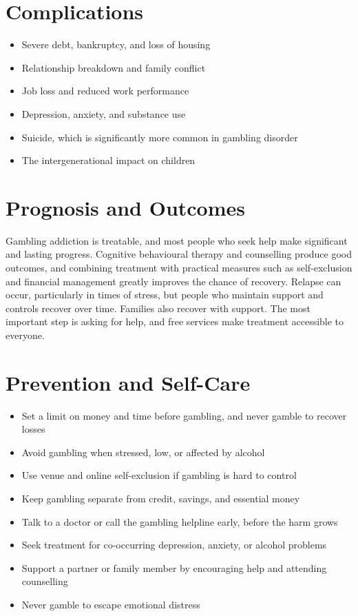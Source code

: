 \section*{Complications}
\begin{itemize}
    \item Severe debt, bankruptcy, and loss of housing
    \item Relationship breakdown and family conflict
    \item Job loss and reduced work performance
    \item Depression, anxiety, and substance use
    \item Suicide, which is significantly more common in gambling disorder
    \item The intergenerational impact on children
\end{itemize}

\section*{Prognosis and Outcomes}
Gambling addiction is treatable, and most people who seek help make significant and lasting progress. Cognitive behavioural therapy and counselling produce good outcomes, and combining treatment with practical measures such as self-exclusion and financial management greatly improves the chance of recovery. Relapse can occur, particularly in times of stress, but people who maintain support and controls recover over time. Families also recover with support. The most important step is asking for help, and free services make treatment accessible to everyone.

\section*{Prevention and Self-Care}
\begin{itemize}
    \item Set a limit on money and time before gambling, and never gamble to recover losses
    \item Avoid gambling when stressed, low, or affected by alcohol
    \item Use venue and online self-exclusion if gambling is hard to control
    \item Keep gambling separate from credit, savings, and essential money
    \item Talk to a doctor or call the gambling helpline early, before the harm grows
    \item Seek treatment for co-occurring depression, anxiety, or alcohol problems
    \item Support a partner or family member by encouraging help and attending counselling
    \item Never gamble to escape emotional distress
\end{itemize}

